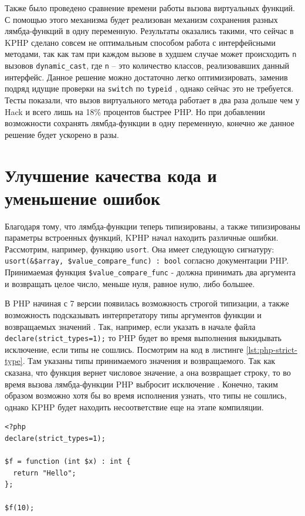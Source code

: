 Также было проведено сравнение времени работы вызова виртуальных функций.
С помощью этого механизма будет реализован механизм сохранения разных лямбда-функций в одну переменную.
Результаты оказались такими, что сейчас в KPHP сделано совсем не оптимальным способом работа с интерфейсными методами, так как там при каждом вызове в худшем случае может происходить \verb|n| вызовов \verb|dynamic_cast|, где \verb|n| -- это количество классов, реализовавших данный интерфейс.
Данное решение можно достаточно легко оптимизировать, заменив подряд идущие проверки на \verb|switch| по \verb|typeid| \cite{fast-dynamic-cast}, однако сейчас это не требуется.
Тесты показали, что вызов виртуального метода работает в два раза дольше чем у Hack и всего лишь на 18\% процентов быстрее PHP.
Но при добавлении возможности сохранять лямбда-функции в одну переменную, конечно же данное решение будет ускорено в разы.

\section{Улучшение качества кода и уменьшение ошибок}
Благодаря тому, что лямбда-функции теперь типизированы, а также типизированы параметры встроенных функций, KPHP начал находить различные ошибки.
Рассмотрим, например, функцию \verb|usort|.
Она имеет следующую сигнатуру: \verb|usort(&$array, $value_compare_func) : bool| согласно документации PHP.
Принимаемая функция \verb|$value_compare_func| - должна принимать два аргумента и возвращать целое число, меньше нуля, равное нулю, либо большее.

В PHP начиная с 7 версии появилась возможность строгой типизации, а также возможность подсказывать интерпретатору типы аргументов функции и возвращаемых значений \cite{php-7-strict-types}.
Так, например, если указать в начале файла \verb|declare(strict_types=1);| то PHP будет во время выполнения выкидывать исключение, если типы не сошлись.
Посмотрим на код в листинге \ref{lst:php-strict-type}.
Там указаны типы принимаемого значения и возвращаемого.
Так как сказана, что функция вернет числовое значение, а она возвращает строку, то во время вызова лямбда-функции PHP выбросит исключение \cite{php-7-pitfalls}.
Конечно, таким образом возможно хотя бы во время исполнения узнать, что типы не сошлись, однако KPHP будет находить несоответствие еще на этапе компиляции.
\begin{lstlisting}[caption={Пример типизации в PHP7}, label={lst:php-strict-type}]
<?php
declare(strict_types=1);

$f = function (int $x) : int {
  return "Hello";
};

$f(10);
\end{lstlisting}

